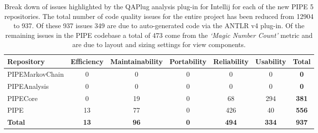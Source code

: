 \begin{table}[tb]
\small
\begin{center}
  \begin{tabular}{| l | c | c | c | c | c | c |}
    \hline
    Repository & Efficiency & Maintainability & Portability & Reliability & Usability & \textbf{Total} \\ 
    \hline
    PIPEMarkovChain & 0 & 0 & 0 & 0 & 0 & \textbf{0}\\ 
    \hline
    PIPEAnalysis & 0 & 0 & 0 & 0 & 0 & \textbf{0}\\    
    \hline
    PIPECore & 0 & 19 & 0 & 68 & 294 & \textbf{381}\\
    \hline
    PIPE & 13 & 77 & 0 & 426 & 40 & \textbf{556}\\
    \hline
    \textbf{Total} & \textbf{13} & \textbf{96} & \textbf{0} & \textbf{494} & \textbf{334} & {\color{red}\textbf{937}}\\
    \hline

  \end{tabular}
\caption{Break down of issues highlighted by the QAPlug analysis plug-in for Intellij for
each of the new PIPE 5 repositories. The total number of code quality issues for the entire project has been reduced from \num{12904} to \num{937}. Of these \num{937} issues \num{349} are due to auto-generated code via the ANTLR v4 plug-in.
Of the remaining issues in the PIPE codebase a total of \num{473} come from the \textit{`Magic Number Count'} metric and are due to layout and sizing settings for view components.
}
\label{tbl:pipe5_qaplug}
\end{center}
\end{table}